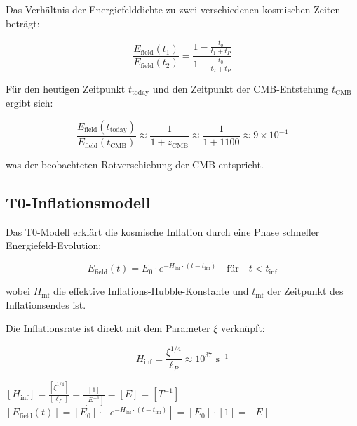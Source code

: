 \documentclass[12pt,a4paper]{article}
\theoremstyle{definition}
\begin{document}
\begin{verhaltnis}
	Das Verhältnis der Energiefelddichte zu zwei verschiedenen kosmischen Zeiten beträgt:
	
	\begin{equation}
		\frac{E_{\text{field}}(t_1)}{E_{\text{field}}(t_2)} = \frac{1 - \frac{t_0}{t_1 + t_P}}{1 - \frac{t_0}{t_2 + t_P}}
	\end{equation}
	
	Für den heutigen Zeitpunkt $t_{\text{today}}$ und den Zeitpunkt der CMB-Entstehung $t_{\text{CMB}}$ ergibt sich:
	
	\begin{equation}
		\frac{E_{\text{field}}(t_{\text{today}})}{E_{\text{field}}(t_{\text{CMB}})} \approx \frac{1}{1 + z_{\text{CMB}}} \approx \frac{1}{1 + 1100} \approx 9 \times 10^{-4}
	\end{equation}
	
	was der beobachteten Rotverschiebung der CMB entspricht.
\end{verhaltnis}

\subsection{T0-Inflationsmodell}

Das T0-Modell erklärt die kosmische Inflation durch eine Phase schneller Energiefeld-Evolution:

\begin{equation}
	E_{\text{field}}(t) = E_0 \cdot e^{-H_{\text{inf}} \cdot (t - t_{\text{inf}})} \quad \text{für} \quad t < t_{\text{inf}}
\end{equation}

wobei $H_{\text{inf}}$ die effektive Inflations-Hubble-Konstante und $t_{\text{inf}}$ der Zeitpunkt des Inflationsendes ist.

Die Inflationsrate ist direkt mit dem Parameter $\xi$ verknüpft:

\begin{equation}
	H_{\text{inf}} = \frac{\xi^{1/4}}{\ell_P} \approx 10^{37} \text{ s}^{-1}
\end{equation}

\begin{einheitencheck}
	$[H_{\text{inf}}] = \frac{[\xi^{1/4}]}{[\ell_P]} = \frac{[1]}{[E^{-1}]} = [E] = [T^{-1}]$ \checkmark\\
	$[E_{\text{field}}(t)] = [E_0] \cdot [e^{-H_{\text{inf}} \cdot (t - t_{\text{inf}})}] = [E_0] \cdot [1] = [E]$ \checkmark
\end{einheitencheck}
\end{document}
